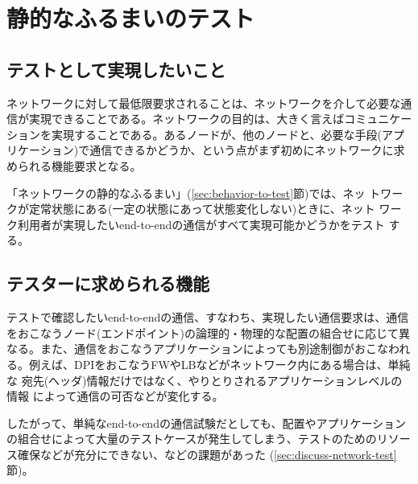
 \section{静的なふるまいのテスト}

  \subsection{テストとして実現したいこと}
ネットワークに対して最低限要求されることは、ネットワークを介して必要な通
信が実現できることである。ネットワークの目的は、大きく言えばコミュニケー
ションを実現することである。あるノードが、他のノードと、必要な手段(アプ
リケーション)で通信できるかどうか、という点がまず初めにネットワークに求
められる機能要求となる。

「ネットワークの静的なふるまい」(\ref{sec:behavior-to-test}節)では、ネッ
トワークが定常状態にある(一定の状態にあって状態変化しない)ときに、ネット
ワーク利用者が実現したいend-to-endの通信がすべて実現可能かどうかをテスト
する。

  \subsection{テスターに求められる機能}

テストで確認したいend-to-endの通信、すなわち、実現したい通信要求は、通信
をおこなうノード(エンドポイント)の論理的・物理的な配置の組合せに応じて異
なる。また、通信をおこなうアプリケーションによっても別途制御がおこなわれ
る。例えば、DPIをおこなうFWやLBなどがネットワーク内にある場合は、単純な
宛先(ヘッダ)情報だけではなく、やりとりされるアプリケーションレベルの情報
によって通信の可否などが変化する。

したがって、単純なend-to-endの通信試験だとしても、配置やアプリケーション
の組合せによって大量のテストケースが発生してしまう、テストのためのリソー
ス確保などが充分にできない、などの課題があった
(\ref{sec:discuss-network-test}節)。

